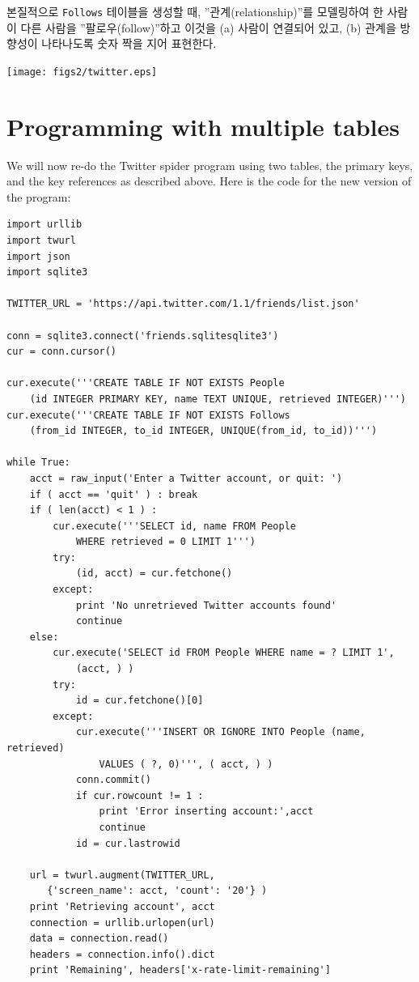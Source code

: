 본질적으로 {\tt Follows} 테이블을 생성할 때, ''관계(relationship)''를 모델링하여 한 사람이 다른 사람을 ''팔로우(follow)''하고
이것을 (a) 사람이 연결되어 있고, (b) 관계을 방향성이 나타나도록 숫자 짝을 지어 표현한다.  

\beforefig
\centerline{\texttt{[image: figs2/twitter.eps]}}
\afterfig

\section{Programming with multiple tables}

We will now re-do the Twitter spider program using two tables, the primary
keys, and the key references as described above.  Here is the code for 
the new version of the program:

\beforeverb
\begin{verbatim}
import urllib
import twurl
import json
import sqlite3

TWITTER_URL = 'https://api.twitter.com/1.1/friends/list.json'

conn = sqlite3.connect('friends.sqlitesqlite3')
cur = conn.cursor()

cur.execute('''CREATE TABLE IF NOT EXISTS People 
    (id INTEGER PRIMARY KEY, name TEXT UNIQUE, retrieved INTEGER)''')
cur.execute('''CREATE TABLE IF NOT EXISTS Follows 
    (from_id INTEGER, to_id INTEGER, UNIQUE(from_id, to_id))''')

while True:
    acct = raw_input('Enter a Twitter account, or quit: ')
    if ( acct == 'quit' ) : break
    if ( len(acct) < 1 ) :
        cur.execute('''SELECT id, name FROM People 
            WHERE retrieved = 0 LIMIT 1''')
        try:
            (id, acct) = cur.fetchone()
        except:
            print 'No unretrieved Twitter accounts found'
            continue
    else:
        cur.execute('SELECT id FROM People WHERE name = ? LIMIT 1', 
            (acct, ) )
        try:
            id = cur.fetchone()[0]
        except:
            cur.execute('''INSERT OR IGNORE INTO People (name, retrieved) 
                VALUES ( ?, 0)''', ( acct, ) )
            conn.commit()
            if cur.rowcount != 1 : 
                print 'Error inserting account:',acct
                continue
            id = cur.lastrowid

    url = twurl.augment(TWITTER_URL, 
       {'screen_name': acct, 'count': '20'} )
    print 'Retrieving account', acct
    connection = urllib.urlopen(url)
    data = connection.read()
    headers = connection.info().dict
    print 'Remaining', headers['x-rate-limit-remaining']


\end{verbatim}
